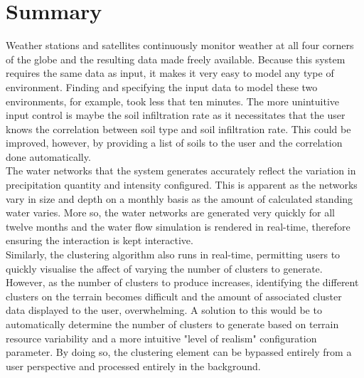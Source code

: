 \section{Summary}

Weather stations and satellites continuously monitor weather at all four corners of the globe and the resulting data made freely available. Because this system requires the same data as input, it makes it very easy to model any type of environment. Finding and specifying the input data to model these two environments, for example, took less that ten minutes. The more unintuitive input control is maybe the soil infiltration rate as it necessitates that the user knows the correlation between soil type and soil infiltration rate. This could be improved, however, by providing a list of soils to the user and the correlation done automatically.\\

The water networks that the system generates accurately reflect the variation in precipitation quantity and intensity configured. This is apparent as the networks vary in size and depth on a monthly basis as the amount of calculated standing water varies. More so, the water networks are generated very quickly for all twelve months and the water flow simulation is rendered in real-time, therefore ensuring the interaction is kept interactive. \\

Similarly, the clustering algorithm also runs in real-time, permitting users to quickly visualise the affect of varying the number of clusters to generate. However, as the number of clusters to produce increases, identifying the different clusters on the terrain becomes difficult and the amount of associated cluster data displayed to the user, overwhelming. A solution to this would be to automatically determine the number of clusters to generate based on terrain resource variability and a more intuitive "level of realism" configuration parameter. By doing so, the clustering element can be bypassed entirely from a user perspective and processed entirely in the background.\\

